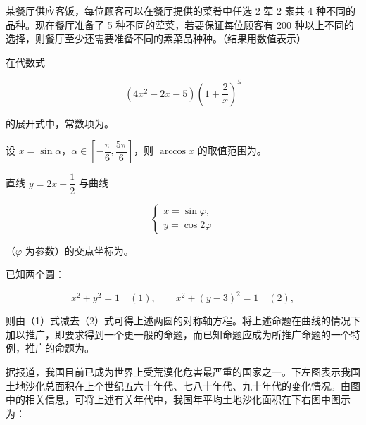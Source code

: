 \begin{question}
某餐厅供应客饭，每位顾客可以在餐厅提供的菜肴中任选 2 荤 2 素共 4 种不同的品种。现在餐厅准备了 5 种不同的荤菜，若要保证每位顾客有 200 种以上不同的选择，则餐厅至少还需要准备不同的素菜品种\gkblank{}种。（结果用数值表示）

\end{question}
\begin{question}
在代数式

\nopagebreak[4]
\[
(4x^2-2x-5)\left(1+\frac2x\right)^5
\]

的展开式中，常数项为\gkblank{}。

\end{question}
\begin{question}
设 $x=\sin\alpha$，$\alpha\in\left[-\dfrac\pi6,\dfrac{5\pi}6\right]$，则 $\arccos x$ 的取值范围为\gkblank{}。

\end{question}
\begin{question}
直线 $y=2x-\dfrac12$ 与曲线

\nopagebreak[4]
\[
\begin{cases}
x=\sin\varphi,\\
y=\cos2\varphi
\end{cases}
\]

（$\varphi$ 为参数）的交点坐标为\gkblank{}。

\end{question}
\begin{question}
已知两个圆：

\nopagebreak[4]
\[
x^2+y^2=1\quad(1),\qquad x^2+(y-3)^2=1\quad(2),
\]

则由（1）式减去（2）式可得上述两圆的对称轴方程。将上述命题在曲线的情况下加以推广，即要求得到一个更一般的命题，而已知命题应成为所推广命题的一个特例，推广的命题为\gkblank{}。

\Needspace{0.4\textheight}
\end{question}
\begin{question}
据报道，我国目前已成为世界上受荒漠化危害最严重的国家之一。下左图表示我国土地沙化总面积在上个世纪五六十年代、七八十年代、九十年代的变化情况。由图中的相关信息，可将上述有关年代中，我国年平均土地沙化面积在下右图中图示为：
\nopagebreak[4]
\begin{center}\end{center}
\nopagebreak[4]
\end{question}

